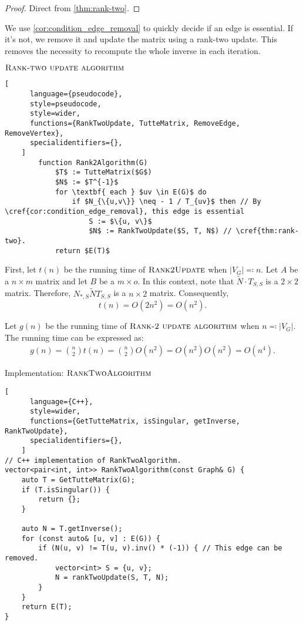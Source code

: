 \begin{proof}
    Direct from \cref{thm:rank-two}. 
\end{proof}

We use \cref{cor:condition_edge_removal} to quickly decide if an edge is essential. 
If it's not, we remove it and update the matrix using a rank-two update. 
This removes the necessity to recompute the whole inverse in each iteration.

\begin{programruledcaption}{\(\textsc{Rank-two update algorithm}\)}
    \begin{lstlisting}[
      language={pseudocode},
      style=pseudocode,
      style=wider,
      functions={RankTwoUpdate, TutteMatrix, RemoveEdge, RemoveVertex},
      specialidentifiers={},
    ]
        function Rank2Algorithm(G)
            $T$ := TutteMatrix($G$)
            $N$ := $T^{-1}$
            for \textbf{ each } $uv \in E(G)$ do
                if $N_{\{u,v\}} \neq - 1 / T_{uv}$ then // By \cref{cor:condition_edge_removal}, this edge is essential
                    S := $\{u, v\}$
                    $N$ := RankTwoUpdate($S, T, N$) // \cref{thm:rank-two}.
            return $E(T)$
    \end{lstlisting}
\end{programruledcaption}

First, let \(t(n)\) be the running time of \(\textsc{Rank2Update}\) when \(|V_G| \eqcolon n\).
Let \(A\) be a \(n \times m\) matrix and let \(B\) be a \(m \times o\).
In this context, note that \(\tilde{N} \cdot T_{S, S}\) is a \(2 \times 2\) matrix.
Therefore, \(N_{*, S}\tilde{N}T_{S, S}\) is a \(n \times 2\) matrix.
Consequently,
\[
    t(n) = O(2n^2) = O(n^2).
\]

Let \(g(n)\) be the running time of \(\textsc{Rank-2 update algorithm}\) when \(n \eqcolon |V_G|\).
The running time can be expressed as:
\begin{align*}
    g(n) = \binom{n}{2} t(n) = \binom{n}{2} O(n^2) = O(n^2) O(n^2) = O(n^4).
\end{align*}

\begin{programruledcaption}{Implementation: \(\textsc{RankTwoAlgorithm}\)}
    \begin{lstlisting}[
      language={C++},
      style=wider,
      functions={GetTutteMatrix, isSingular, getInverse, RankTwoUpdate},
      specialidentifiers={},
    ]
// C++ implementation of RankTwoAlgorithm.
vector<pair<int, int>> RankTwoAlgorithm(const Graph& G) {
    auto T = GetTutteMatrix(G);
    if (T.isSingular()) {
        return {};
    } 

    auto N = T.getInverse();
    for (const auto& [u, v] : E(G)) {
        if (N(u, v) != T(u, v).inv() * (-1)) { // This edge can be removed.
            vector<int> S = {u, v};
            N = rankTwoUpdate(S, T, N);
        }
    }
    return E(T);
}
    \end{lstlisting}
\end{programruledcaption}